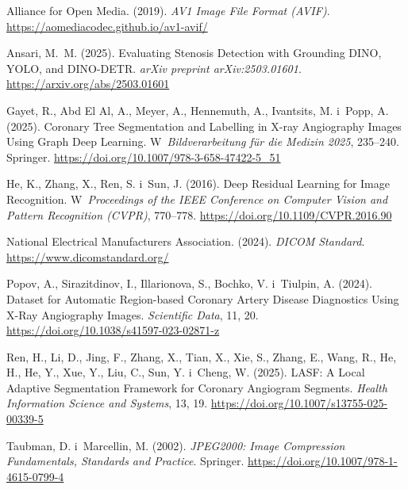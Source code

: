 \documentclass[12pt,a4paper]{article}
\begin{document}
\begin{enumerate}[label={[\arabic*]}]
    \item \hypertarget{bib1}{}Alliance for Open Media. (2019). \textit{AV1 Image File Format (AVIF)}. \url{https://aomediacodec.github.io/av1-avif/}

    \item \hypertarget{bib2}{}Ansari, M.~M. (2025). Evaluating Stenosis Detection with Grounding DINO, YOLO, and DINO-DETR. \textit{arXiv preprint arXiv:2503.01601}. \url{https://arxiv.org/abs/2503.01601}

    \item \hypertarget{bib3}{}Gayet, R., Abd El Al, A., Meyer, A., Hennemuth, A., Ivantsits, M. i~Popp, A. (2025). Coronary Tree Segmentation and Labelling in X-ray Angiography Images Using Graph Deep Learning. W~\textit{Bildverarbeitung f\"{u}r die Medizin 2025}, 235--240. Springer. \url{https://doi.org/10.1007/978-3-658-47422-5_51}

    \item \hypertarget{bib4}{}He, K., Zhang, X., Ren, S. i~Sun, J. (2016). Deep Residual Learning for Image Recognition. W~\textit{Proceedings of the IEEE Conference on Computer Vision and Pattern Recognition (CVPR)}, 770--778. \url{https://doi.org/10.1109/CVPR.2016.90}

    \item \hypertarget{bib5}{}National Electrical Manufacturers Association. (2024). \textit{DICOM Standard}. \url{https://www.dicomstandard.org/}

    \item \hypertarget{bib6}{}Popov, A., Sirazitdinov, I., Illarionova, S., Bochko, V. i~Tiulpin, A. (2024). Dataset for Automatic Region-based Coronary Artery Disease Diagnostics Using X-Ray Angiography Images. \textit{Scientific Data}, 11, 20. \url{https://doi.org/10.1038/s41597-023-02871-z}

    \item \hypertarget{bib7}{}Ren, H., Li, D., Jing, F., Zhang, X., Tian, X., Xie, S., Zhang, E., Wang, R., He, H., He, Y., Xue, Y., Liu, C., Sun, Y. i~Cheng, W. (2025). LASF: A Local Adaptive Segmentation Framework for Coronary Angiogram Segments. \textit{Health Information Science and Systems}, 13, 19. \url{https://doi.org/10.1007/s13755-025-00339-5}

    \item \hypertarget{bib8}{}Taubman, D. i~Marcellin, M. (2002). \textit{JPEG2000: Image Compression Fundamentals, Standards and Practice}. Springer. \url{https://doi.org/10.1007/978-1-4615-0799-4}


\end{enumerate}
\end{document}
